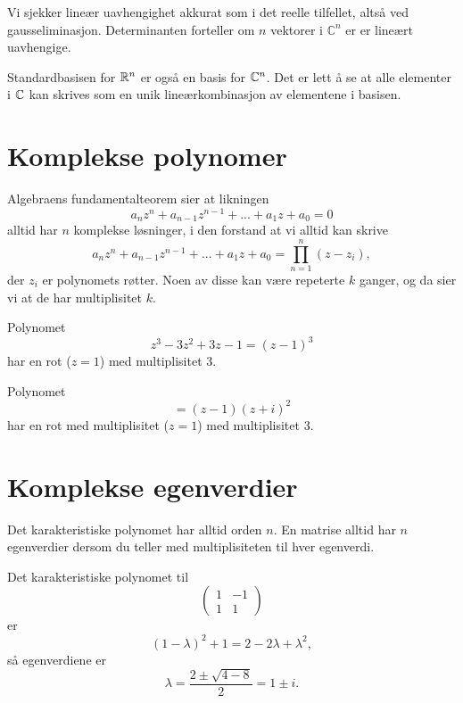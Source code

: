 \begin{ex}
Vi sjekker lineær uavhengighet akkurat som i det reelle tilfellet, altså ved gausseliminasjon. Determinanten forteller om $n$ vektorer i $\mathbb C^n$ er er lineært uavhengige.
\end{ex}

\begin{ex}
Standardbasisen for $\mathbb{R}^n$ er også en basis for $\mathbb{C}^n$. Det er lett å se at alle elementer i $\mathbb{C}$ kan skrives som en unik lineærkombinasjon av elementene i basisen.
\end{ex}



\section*{Komplekse polynomer}

Algebraens fundamentalteorem sier at likningen
\[
a_nz^n+a_{n-1}z^{n-1}+...+a_1z+a_0=0
\]
alltid har $n$ komplekse løsninger, i den forstand at vi alltid kan skrive
\[
a_nz^n+a_{n-1}z^{n-1}+...+a_1z+a_0=\prod_{n=1}^n (z-z_i),
\]
der $z_i$ er polynomets røtter. Noen av disse kan være repeterte $k$ ganger, og da sier vi at de har multiplisitet $k$. 

\begin{ex}
Polynomet 
\[
z^3-3z^2+3z-1=(z-1)^3
\]
har en rot ($z=1$) med multiplisitet 3.
\end{ex}

\begin{ex}
Polynomet 
\[
=(z-1)(z+i)^2
\]
har en rot med multiplisitet ($z=1$) med multiplisitet 3.
\end{ex}

\section*{Komplekse egenverdier}

\begin{thm}
Det karakteristiske polynomet har alltid orden $n$. 
En matrise alltid har $n$ egenverdier dersom du 
teller med multiplisiteten til hver egenverdi. 
\end{thm}

\begin{ex}
Det karakteristiske polynomet til
\[
\begin{pmatrix}
1 & -1 \\ 1 &1
\end{pmatrix}
\]
er 
\[
(1-\lambda)^2+1=2-2\lambda+\lambda^2,
\]
så egenverdiene er 
\[
\lambda=\frac{2\pm\sqrt{4-8}}{2}=1\pm i.
\] 
\end{ex}

